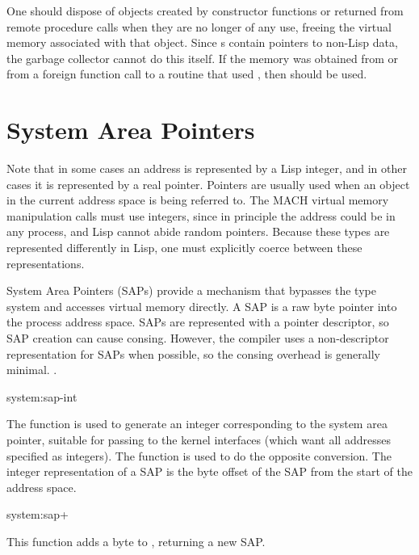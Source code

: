 One should dispose of \alien{} objects created by constructor
functions or returned from remote procedure calls when they are no
longer of any use, freeing the virtual memory associated with that
object.  Since \alien{}s contain pointers to non-Lisp data, the
garbage collector cannot do this itself.  If the memory
was obtained from  or from a foreign function call
to a routine that used , then  should
be used.


\section{System Area Pointers}
\label{system-area-pointers}

Note that in some cases an address is represented by a Lisp integer, and in
other cases it is represented by a real pointer.  Pointers are usually used
when an object in the current address space is being referred to.  The MACH
virtual memory manipulation calls must use integers, since in principle the
address could be in any process, and Lisp cannot abide random pointers.
Because these types are represented differently in Lisp, one must explicitly
coerce between these representations.

System Area Pointers (SAPs) provide a mechanism that bypasses the
\alien{} type system and accesses virtual memory directly.  A SAP is a
raw byte pointer into the  process address space.  SAPs are
represented with a pointer descriptor, so SAP creation can cause
consing.  However, the compiler uses a non-descriptor representation
for SAPs when possible, so the consing overhead is generally minimal.
.

\begin{defun}{system:}{sap-int}{}
  
  The function  is used to generate an integer
  corresponding to the system area pointer, suitable for passing to
  the kernel interfaces (which want all addresses specified as
  integers).  The function  is used to do the opposite
  conversion.  The integer representation of a SAP is the byte offset
  of the SAP from the start of the address space.
\end{defun}

\begin{defun}{system:}{sap+}{}
  
  This function adds a byte  to , returning a new
  SAP.
\end{defun}

